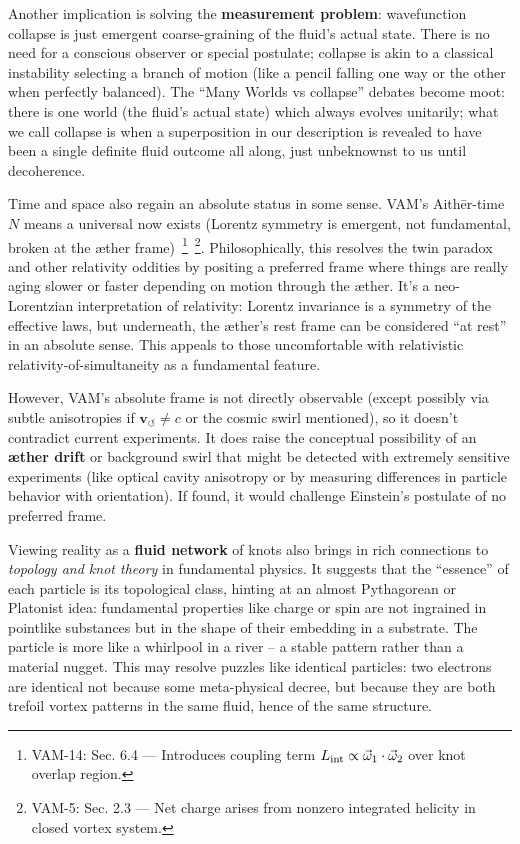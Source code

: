 \documentclass[a4paper,12pt]{article}
\begin{document}
    Another implication is solving the \textbf{measurement problem}: wavefunction collapse is just emergent coarse-graining of the fluid’s actual state. There is no need for a conscious observer or special postulate; collapse is akin to a classical instability selecting a branch of motion (like a pencil falling one way or the other when perfectly balanced). The “Many Worlds vs collapse” debates become moot: there is one world (the fluid’s actual state) which always evolves unitarily; what we call collapse is when a superposition in our description is revealed to have been a single definite fluid outcome all along, just unbeknownst to us until decoherence.

    Time and space also regain an absolute status in some sense. VAM’s Aithēr-time $N$ means a universal now exists (Lorentz symmetry is emergent, not fundamental, broken at the æther frame)~\footnote{VAM-14: Sec. 6.4 — Introduces coupling term $L_{\rm int} \propto \vec{\omega}_1 \cdot \vec{\omega}_2$ over knot overlap region.}~\footnote{VAM-5: Sec. 2.3 — Net charge arises from nonzero integrated helicity in closed vortex system.}. Philosophically, this resolves the twin paradox and other relativity oddities by positing a preferred frame where things are really aging slower or faster depending on motion through the æther. It’s a neo-Lorentzian interpretation of relativity: Lorentz invariance is a symmetry of the effective laws, but underneath, the æther’s rest frame can be considered “at rest” in an absolute sense. This appeals to those uncomfortable with relativistic relativity-of-simultaneity as a fundamental feature.

    However, VAM’s absolute frame is not directly observable (except possibly via subtle anisotropies if $\mathbf{v}_{\scriptscriptstyle\boldsymbol{\circlearrowleft}} \neq c$ or the cosmic swirl mentioned), so it doesn’t contradict current experiments. It does raise the conceptual possibility of an \textbf{æther drift} or background swirl that might be detected with extremely sensitive experiments (like optical cavity anisotropy or by measuring differences in particle behavior with orientation). If found, it would challenge Einstein’s postulate of no preferred frame.

    Viewing reality as a \textbf{fluid network} of knots also brings in rich connections to \emph{topology and knot theory} in fundamental physics. It suggests that the “essence” of each particle is its topological class, hinting at an almost Pythagorean or Platonist idea: fundamental properties like charge or spin are not ingrained in pointlike substances but in the shape of their embedding in a substrate. The particle is more like a whirlpool in a river – a stable pattern rather than a material nugget. This may resolve puzzles like identical particles: two electrons are identical not because some meta-physical decree, but because they are both trefoil vortex patterns in the same fluid, hence of the same structure.
\end{document}
